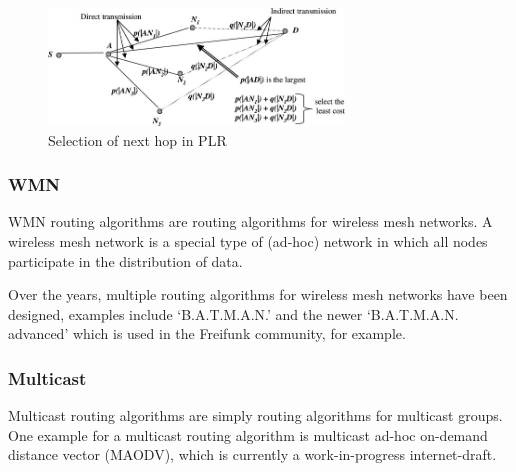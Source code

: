 \begin{figure}
\centering
\includegraphics[width=0.7\textwidth]{images/plr-example}
\caption{Selection of next hop in PLR\cite{alotaibi2012survey}}
\label{plrexample}
\end{figure}

\subsubsection*{WMN}
WMN routing algorithms are routing algorithms for wireless mesh networks.
A wireless mesh network is a special type of (ad-hoc) network in which all
nodes participate in the distribution of data.

Over the years, multiple routing algorithms for wireless mesh networks have
been designed, examples include `B.A.T.M.A.N.' and the newer `B.A.T.M.A.N. advanced'
which is used in the Freifunk community, for example\cite{batman-adv}.

\subsubsection*{Multicast}
Multicast routing algorithms are simply routing algorithms for multicast
groups.
One example for a multicast routing algorithm is multicast ad-hoc on-demand
distance vector (MAODV)\cite{manet-maodv-00}, which is currently a
work-in-progress internet-draft.
